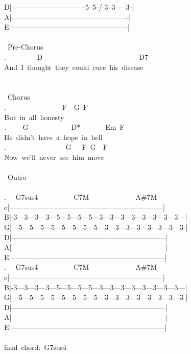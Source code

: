 {D|-------------------------------5--5-/-3--3-----3-|\\
A|-------------------------------------------------|\\
E|-------------------------------------------------|\\
\\
\lbrack\ Pre-Chorus\rbrack\\
. \ \ \ \ \ \ \ \ D\ \ \ \ \ \ \ \ \ \ \ \ \ \ \ \ \ \ \ \ \ \ \ \ \ \ \ D7\\
And\ I\ thought\ they\ could\ cure\ his\ disease\\
\\
\\
\lbrack\ Chorus\rbrack\\
. \ \ \ \ \ \ \ \ \ \ \ \ \ \ \ F\ \ G\ F\\
But\ in\ all\ honesty\\
. \ \ \ \ G\ \ \ \ \ \ \ \ \ \ \ \ D*\ \ \ \ \ \ \ Em\ F\\
He\ didn't\ have\ a\ hope\ in\ hell\\
. \ \ \ \ \ \ \ \ \ \ \ \ \ \ \ \ G\ \ \ F\ G\ \ F\\
Now\ we'll\ never\ see\ him\ move\\
\\
\lbrack\ Outro\rbrack\\
\\
. \ \ G7sus4\ \ \ \ \ \ \ \ \ \ C7M\ \ \ \ \ \ \ \ \ \ \ \ \ A\#7M\\
e|-----------------------------------------------------------------|\\
B|-3---3---3---3---5---5---5---5---3---3---3---3---3---3---3---3---|\\
G|---5---5---5---5---5---5---5---5---3---3---3---3---3---3---3---3-|\\
D|-----------------------------------------------------------------|\\
A|-----------------------------------------------------------------|\\
E|-----------------------------------------------------------------|\\
. \ \ G7sus4\ \ \ \ \ \ \ \ \ \ C7M\ \ \ \ \ \ \ \ \ \ \ \ \ A\#7M\\
e|-----------------------------------------------------------------|\\
B|-3---3---3---3---5---5---5---5---3---3---3---3---3---3---3---3---|\\
G|---5---5---5---5---5---5---5---5---3---3---3---3---3---3---3---3-|\\
D|-----------------------------------------------------------------|\\
A|-----------------------------------------------------------------|\\
E|-----------------------------------------------------------------|\\
\\
final\ chord:\ G7sus4\ }
